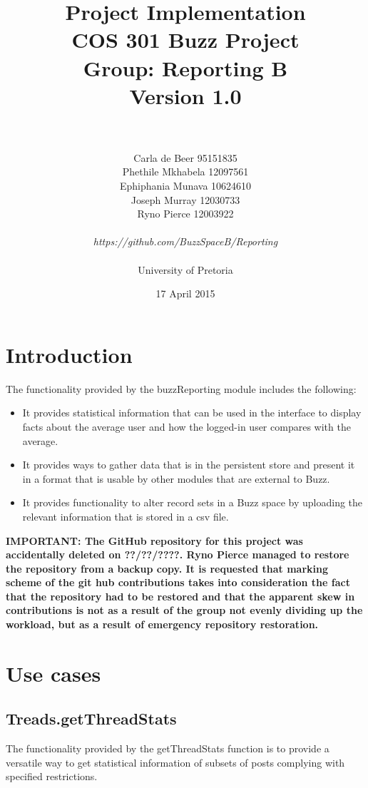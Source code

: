 \documentclass[a4paper]{article}
\title{Project Implementation
\\COS 301 Buzz Project
\\Group: Reporting B
\\Version 1.0}
\author{
\\
\\Carla de Beer 95151835
\\Phethile Mkhabela 12097561
\\Ephiphania Munava 10624610
\\Joseph Murray 12030733
\\Ryno Pierce 12003922
\\
\\
\textit{https://github.com/BuzzSpaceB/Reporting}
\\
\\ University of Pretoria}
\date{17 April 2015}
\begin{document}
\maketitle
\newpage


\tableofcontents
\newpage

\section{Introduction}

The functionality provided by the buzzReporting module includes the following:

\begin{itemize}
\item It provides statistical information that can be used in the interface to display facts about the
average user and how the logged-in user compares with the average.
\item It provides ways to gather data that is in the persistent store and present it in a format that
is usable by other modules that are external to Buzz.
\item It provides functionality to alter record sets in a Buzz space by uploading the relevant information that is stored in a csv file.
\end{itemize}

\textbf{IMPORTANT: The GitHub repository for this project was accidentally deleted on ??/??/????. Ryno Pierce managed to restore the repository from a backup copy. It is requested that marking scheme of the git hub contributions takes into consideration the fact that the repository had to be restored and that the apparent skew in contributions is not as a result of the group not evenly dividing up the workload, but as a result of emergency repository restoration.}


\section{Use cases}

\subsection {Treads.getThreadStats} The functionality provided by the
getThreadStats function is to provide a versatile way to get statistical information of subsets of
posts complying with specified restrictions.
\end{document}
